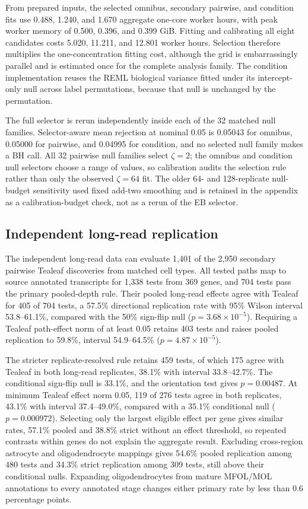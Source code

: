 \documentclass[11pt]{article}
\begin{document}
From prepared inputs, the selected omnibus, secondary pairwise, and condition fits use 0.488, 1.240, and 1.670 aggregate one-core worker hours, with peak worker memory of 0.500, 0.396, and 0.399 GiB. Fitting and calibrating all eight candidates costs 5.020, 11.211, and 12.801 worker hours. Selection therefore multiplies the one-concentration fitting cost, although the grid is embarrassingly parallel and is estimated once for the complete analysis family. The condition implementation reuses the REML biological variance fitted under its intercept-only null across label permutations, because that null is unchanged by the permutation.

The full selector is rerun independently inside each of the 32 matched null families. Selector-aware mean rejection at nominal 0.05 is 0.05043 for omnibus, 0.05000 for pairwise, and 0.04995 for condition, and no selected null family makes a BH call. All 32 pairwise null families select \(\zeta=2\); the omnibus and condition null selectors choose a range of values, so calibration audits the selection rule rather than only the observed \(\zeta=64\) fit. The older 64- and 128-replicate null-budget sensitivity used fixed add-two smoothing and is retained in the appendix as a calibration-budget check, not as a rerun of the EB selector.

\subsection*{Independent long-read replication}

The independent long-read data can evaluate 1,401 of the 2,950 secondary pairwise Tealeaf discoveries from matched cell types. All tested paths map to source annotated transcripts for 1,338 tests from 369 genes, and 704 tests pass the primary pooled-depth rule. Their pooled long-read effects agree with Tealeaf for 405 of 704 tests, a 57.5\% directional replication rate with 95\% Wilson interval 53.8--61.1\%, compared with the 50\% sign-flip null (\(p=3.68\times10^{-5}\)). Requiring a Tealeaf path-effect norm of at least 0.05 retains 403 tests and raises pooled replication to 59.8\%, interval 54.9--64.5\% (\(p=4.87\times10^{-5}\)).

The stricter replicate-resolved rule retains 459 tests, of which 175 agree with Tealeaf in both long-read replicates, 38.1\% with interval 33.8--42.7\%. The conditional sign-flip null is 33.1\%, and the orientation test gives \(p=0.00487\). At minimum Tealeaf effect norm 0.05, 119 of 276 tests agree in both replicates, 43.1\% with interval 37.4--49.0\%, compared with a 35.1\% conditional null (\(p=0.000972\)). Selecting only the largest eligible effect per gene gives similar rates, 57.1\% pooled and 38.8\% strict without an effect threshold, so repeated contrasts within genes do not explain the aggregate result. Excluding cross-region astrocyte and oligodendrocyte mappings gives 54.6\% pooled replication among 480 tests and 34.3\% strict replication among 309 tests, still above their conditional nulls. Expanding oligodendrocytes from mature MFOL/MOL annotations to every annotated stage changes either primary rate by less than 0.6 percentage points.
\end{document}
